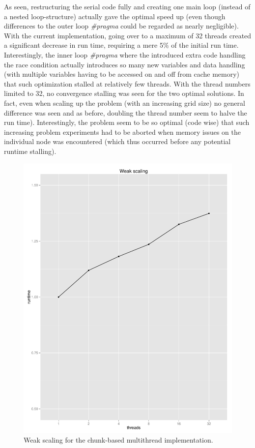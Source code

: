 \documentclass[12pt]{article}
\begin{document}
As seen, restructuring the serial code fully and creating one main loop (instead of a nested loop-structure) actually gave the optimal speed up (even though differences to the outer loop \emph{\color{Plum} \#pragma} could be regarded as nearly negligible). With the current implementation, going over to a maximum of 32 threads created a significant decrease in run time, requiring a mere 5\% of the initial run time. Interestingly, the inner loop \emph{\color{Plum} \#pragma} where the introduced extra code handling the race condition actually introduces so many new variables and data handling (with multiple variables having to be accessed on and off from cache memory) that such optimization stalled at relatively few threads. With the thread numbers limited to 32, no convergence stalling was seen for the two optimal solutions. In fact, even when scaling up the problem (with an increasing grid size) no general difference was seen and as before, doubling the thread number seem to halve the run time). Interestingly, the problem seem to be so optimal (code wise) that such increasing problem experiments had to be aborted when memory issues on the individual node was encountered (which thus occurred before any potential runtime stalling).  

\begin{figure}[]
	\centering
	\includegraphics[scale=0.5]{plot4}
	\caption{Weak scaling for the chunk-based multithread implementation.}
	\label{fig:plot3}
\end{figure}
\end{document}
